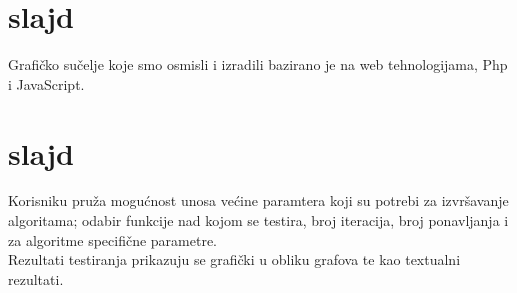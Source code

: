\documentclass[a4paper,10pt]{article}
\begin{document}
\section{slajd}
Grafi\v cko su\v celje koje smo osmisli i izradili bazirano je na web tehnologijama, Php i JavaScript.
\section{slajd}
Korisniku pru\v za mogu\' cnost unosa ve\' cine paramtera koji su potrebi za izvr\v savanje algoritama; odabir funkcije nad kojom se testira, broj iteracija, broj ponavljanja i za algoritme specifi\v cne parametre.\\
Rezultati testiranja prikazuju se grafi\v cki u obliku grafova te kao textualni rezultati.
\end{document}
